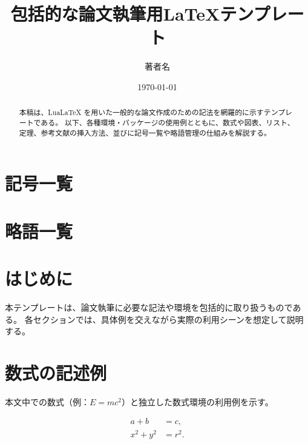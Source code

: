 \documentclass[a4paper,12pt]{ltjsarticle} %
\theoremstyle{definition}
\theoremstyle{remark}
\begin{document}
\title{包括的な論文執筆用\LaTeX テンプレート}
\author{著者名}
\date{\today}
\maketitle

\begin{abstract}
本稿は、LuaLaTeX を用いた一般的な論文作成のための記法を網羅的に示すテンプレートである。
以下、各種環境・パッケージの使用例とともに、数式や図表、リスト、定理、参考文献の挿入方法、並びに記号一覧や略語管理の仕組みを解説する。
\end{abstract}

\tableofcontents
\newpage

\section*{記号一覧}
\printnomenclature
\newpage

\section*{略語一覧}
\begin{acronym}[HTML]
\end{acronym}
\newpage

\section{はじめに}
本テンプレートは、論文執筆に必要な記法や環境を包括的に取り扱うものである。
各セクションでは、具体例を交えながら実際の利用シーンを想定して説明する。

\section{数式の記述例}
本文中での数式（例：$E=mc^2$）と独立した数式環境の利用例を示す。

\begin{align}
a + b &= c, \\
x^2 + y^2 &= r^2.
\end{align}
\end{document}

